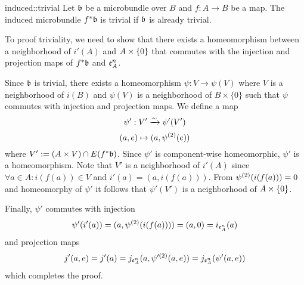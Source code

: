 \begin{mylemma}{induced::trivial}{}
    Let $\mathfrak{b}$ be a microbundle over $B$ and $f: A \to B$ be a map.
    The induced microbundle $f^*\mathfrak{b}$ is trivial if $\mathfrak{b}$ is already trivial.
\end{mylemma}

\begin{myproof}
    To proof triviality, we need to show that there exists a homeomorphism between a neighborhood of $i'(A)$ and $A \times{} \{0\}$
    that commutes with the injection and projection maps of $f^*\mathfrak{b}$ and $\mathfrak{e}^{n}_{A}$.
    
    Since $\mathfrak{b}$ is trivial, there exists a homeomorphism $\psi: V \to \psi(V)$
    where $V$ is a neighborhood of $i(B)$ and $\psi(V)$ is a neighborhood of $B \times \{0\}$
    such that $\psi$ commutes with injection and projection maps.
    We define a map 
    \[ \psi': V' \xrightarrow{\sim} \psi'(V') \]
    \[ (a, e) \mapsto (a, \psi^{(2)}(e)) \]
    where $V' := (A \times V) \cap E(f^*\mathfrak{b})$.
    Since $\psi'$ is component-wise homeomorphic, $\psi'$ is a homeomorphism.
    Note that $V'$ is a neighborhood of $i'(A)$ since $\forall a \in A: i(f(a)) \in V$ and $i'(a) = (a, i(f(a)))$.
    From $\psi^{(2)}(i(f(a))) = 0$ and homeomorphy of $\psi'$ it follows that $\psi'(V')$ is a neighborhood of $A \times{} \{0\}$.

    Finally, $\psi'$ commutes with injection
    \[ \psi'(i'(a)) = (a, \psi^{(2)}(i(f(a)))) = (a, 0) = i_{\mathfrak{e}^{n}_{A}}(a) \]
    and projection maps
    \[ j'(a, e) = j'(a) = j_{\mathfrak{e}^{n}_{A}}(a, \psi'^{(2)}(a, e)) = j_{\mathfrak{e}^{n}_{A}}(\psi'(a, e)) \]
    which completes the proof.
\end{myproof}